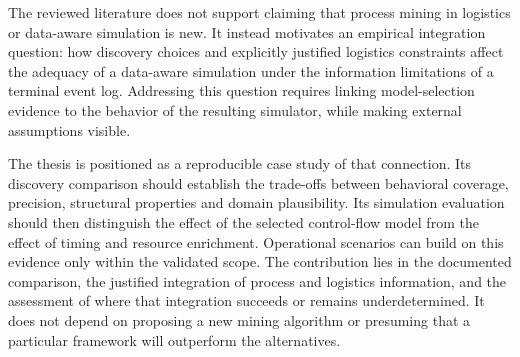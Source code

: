 The reviewed literature does not support claiming that process mining in logistics or data-aware simulation is new. It instead motivates an empirical integration question: how discovery choices and explicitly justified logistics constraints affect the adequacy of a data-aware simulation under the information limitations of a terminal event log. Addressing this question requires linking model-selection evidence to the behavior of the resulting simulator, while making external assumptions visible.

The thesis is positioned as a reproducible case study of that connection. Its discovery comparison should establish the trade-offs between behavioral coverage, precision, structural properties and domain plausibility. Its simulation evaluation should then distinguish the effect of the selected control-flow model from the effect of timing and resource enrichment. Operational scenarios can build on this evidence only within the validated scope. The contribution lies in the documented comparison, the justified integration of process and logistics information, and the assessment of where that integration succeeds or remains underdetermined. It does not depend on proposing a new mining algorithm or presuming that a particular framework will outperform the alternatives.
